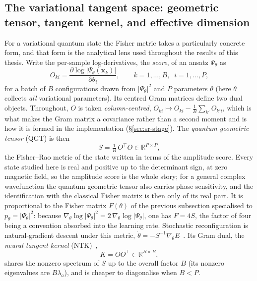\subsection{The variational tangent space: geometric tensor, tangent kernel, and
effective dimension}
\label{sec:theory-tangent-kernel}
For a variational quantum state the Fisher metric takes a particularly concrete form,
and that form is the analytical lens used throughout the results of this thesis. Write the per-sample log-derivatives, the \emph{score}, of an ansatz $\Psi_\theta$ as
\begin{equation}
  O_{ki} = \frac{\partial \log|\Psi_\theta(\mathbf{x}_k)|}{\partial \theta_i},
  \qquad k=1,\dots,B,\;\; i=1,\dots,P,
\end{equation}
for a batch of $B$ configurations drawn from $|\Psi_\theta|^2$ and $P$ parameters
$\theta$ (here $\theta$ collects \emph{all} variational parameters). Its centred Gram
matrices define two dual objects. Throughout, $O$ is taken \emph{column-centred},
$O_{ki}\mapsto O_{ki}-\tfrac1B\sum_{k'}O_{k'i}$, which is what makes the Gram matrix a
covariance rather than a second moment and is how it is formed in the implementation
(\S\ref{sec:sr-stage}). The \emph{quantum geometric tensor} (QGT) is then
\begin{equation}
  S = \tfrac{1}{B}\,O^{\!\top}O \in \mathbb{R}^{P\times P},
\end{equation}
the Fisher--Rao metric of the state written in terms of the amplitude score. Every state
studied here is real and positive up to the determinant sign, at zero magnetic field, so the
amplitude score is the whole story; for a general complex wavefunction the quantum geometric
tensor also carries phase sensitivity, and the identification with the classical Fisher
matrix is then only of its real part. It is
proportional to the Fisher matrix $F(\theta)$ of the previous subsection specialised to
$p_\theta=|\Psi_\theta|^2$: because $\nabla_\theta\log|\Psi_\theta|^2 = 2\,\nabla_\theta\log|\Psi_\theta|$,
one has $F = 4S$, the factor of four being a convention absorbed into the learning
rate. Stochastic reconfiguration is natural-gradient descent under this metric,
$\dot\theta = -S^{-1}\nabla_\theta E$~\cite{BeccaSorella2017-QMCBook,StokesEtAl2020-QuantumNaturalGradient}.
Its Gram dual, the \emph{neural tangent kernel} (NTK)~\cite{JacotEtAl2018-NTK},
\begin{equation}
  K = O O^{\!\top} \in \mathbb{R}^{B\times B},
\end{equation}
shares the nonzero spectrum of $S$ up to the overall factor $B$ (its nonzero eigenvalues are $B\lambda_a$), and is cheaper to diagonalise when
$B<P$.

